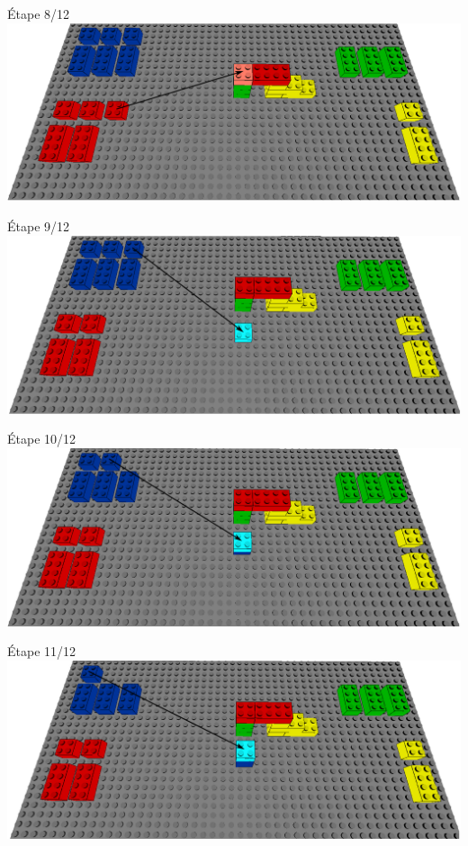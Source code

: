 \documentclass[aspectratio=169]{beamer}
\begin{document}
\begin{frame}
    Étape 8/12
    \vfill
  \includegraphics[width=\linewidth]{step8.png}
\end{frame}

\begin{frame}
    Étape 9/12
    \vfill
  \includegraphics[width=\linewidth]{step9.png}
\end{frame}

\begin{frame}
    Étape 10/12
    \vfill
  \includegraphics[width=\linewidth]{step10.png}
\end{frame}

\begin{frame}
    Étape 11/12
    \vfill
  \includegraphics[width=\linewidth]{step11.png}
\end{frame}
\end{document}
